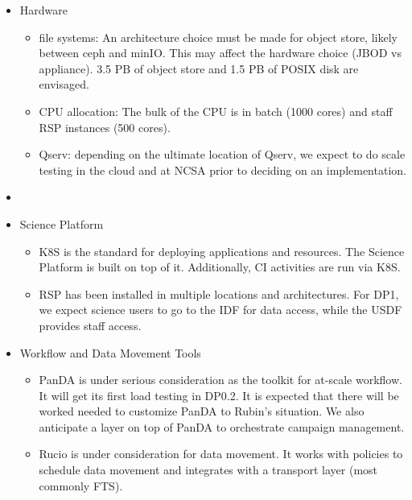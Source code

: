 \begin{itemize}
  \item Hardware
  \begin{itemize}
    \item file systems: An architecture choice must be made for object
      store, likely between ceph and minIO. This may affect the
      hardware choice (\gls{JBOD} vs appliance). 3.5 PB of object store and
      1.5 \gls{PB} of POSIX disk are envisaged.
    \item \gls{CPU} allocation: The bulk of the \gls{CPU} is in batch (1000 cores)
      and staff \gls{RSP} instances (500 cores).
      \item \gls{Qserv}: depending on the ultimate location of \gls{Qserv}, we
        expect to do scale testing in the cloud and at \gls{NCSA} prior to
        deciding on an implementation.
  \end{itemize}

\item
  \item \gls{Science Platform}
  \begin{itemize}
      \item \gls{K8S} is the standard for deploying applications and
        resources. The \gls{Science Platform} is built on top of
        it. Additionally, \gls{CI} activities are run via \gls{K8S}.
      \item \gls{RSP} has been installed in multiple locations and
        architectures. For \gls{DP1}, we expect science users to go to the
        IDF for data access, while the \gls{USDF} provides staff access.
  \end{itemize}

\item Workflow and Data Movement Tools
\begin{itemize}
      \item \gls{PanDA} is under serious consideration as the toolkit
        for at-scale workflow. It will get its first load testing in
        \gls{DP0}.2. It is expected that there will be worked needed to
        customize \gls{PanDA} to Rubin's situation. We also anticipate a
        layer on top of \gls{PanDA} to orchestrate campaign management.
	\item \gls{Rucio} is under consideration for data movement. It
       works with policies to schedule data movement and integrates
       with a transport layer (most commonly \gls{FTS}).
  \end{itemize}

\end{itemize}

